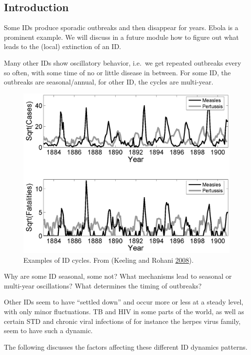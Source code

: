 \documentclass[]{article}
\theoremstyle{definition}
\theoremstyle{definition}
\theoremstyle{definition}
\theoremstyle{remark}
\begin{document}
\subsection{Introduction}\label{introduction-2}

Some IDs produce sporadic outbreaks and then disappear for years. Ebola
is a prominent example. We will discuss in a future module how to figure
out what leads to the (local) extinction of an ID.

Many other IDs show oscillatory behavior, i.e.~we get repeated outbreaks
every so often, with some time of no or little disease in between. For
some ID, the outbreaks are seasonal/annual, for other ID, the cycles are
multi-year.

\begin{figure}
\centering
\includegraphics{./images/IDcycles.png}
\caption{Examples of ID cycles. From (Keeling and Rohani
\protect\hyperlink{ref-keeling08}{2008}).}
\end{figure}

Why are some ID seasonal, some not? What mechanisms lead to seasonal or
multi-year oscillations? What determines the timing of outbreaks?

Other IDs seem to have ``settled down'' and occur more or less at a
steady level, with only minor fluctuations. TB and HIV in some parts of
the world, as well as certain STD and chronic viral infections of for
instance the herpes virus family, seem to have such a dynamic.

The following discusses the factors affecting these different ID
dynamics patterns.
\end{document}
